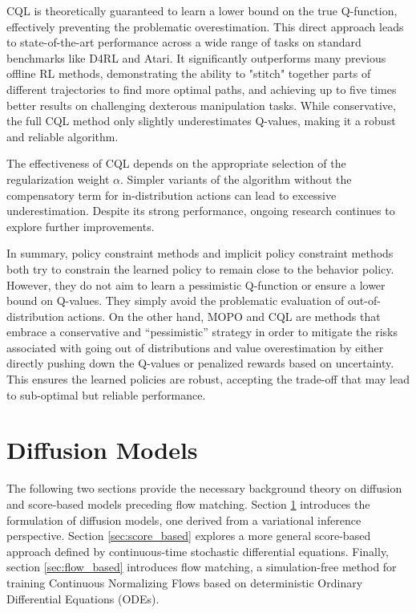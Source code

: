 CQL is theoretically guaranteed to learn a lower bound on the true Q-function, effectively preventing the problematic overestimation. This direct approach leads to state-of-the-art performance across a wide range of tasks on standard benchmarks like D4RL\cite{fu2020d4rl} and Atari\cite{towers2024gymnasium}. It significantly outperforms many previous offline RL methods, demonstrating the ability to "stitch" together parts of different trajectories to find more optimal paths, and achieving up to five times better results on challenging dexterous manipulation tasks. While conservative, the full CQL method only slightly underestimates Q-values, making it a robust and reliable algorithm.

The effectiveness of CQL depends on the appropriate selection of the regularization weight $\alpha$. Simpler variants of the algorithm without the compensatory term for in-distribution actions can lead to excessive underestimation. Despite its strong performance, ongoing research continues to explore further improvements.

In summary, policy constraint methods and implicit policy constraint methods both try to constrain the learned policy to remain close to the behavior policy. However, they do not aim to learn a pessimistic Q-function or ensure a lower bound on Q-values. They simply avoid the problematic evaluation of out-of-distribution actions. On the other hand, MOPO and CQL are methods that embrace a conservative and “pessimistic” strategy in order to mitigate the risks associated with going out of distributions and value overestimation by either directly pushing down the Q-values or penalized rewards based on uncertainty. This ensures the learned policies are robust, accepting the trade-off that may lead to sub-optimal but reliable performance.


\section{Diffusion Models}
\label{sec:diffusion}
The following two sections provide the necessary background theory on diffusion and score-based models preceding flow matching. Section \ref{sec:diffusion} introduces the formulation of diffusion models, one derived from a variational inference perspective. Section \ref{sec:score_based} explores a more general score-based approach defined by continuous-time stochastic differential equations. Finally, section \ref{sec:flow_based} introduces flow matching, a simulation-free method for training Continuous Normalizing Flows based on deterministic Ordinary Differential Equations (ODEs).

